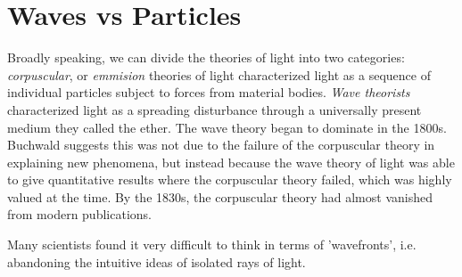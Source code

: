 \section{Waves vs Particles}

Broadly speaking, we can divide the theories of light into two categories: \emph{corpuscular}, or \emph{emmision} theories of light characterized light as a sequence of individual particles subject to forces from material bodies. \emph{Wave theorists} characterized light as a spreading disturbance through a universally present medium they called the ether. The wave theory began to dominate in the 1800s. Buchwald suggests this was not due to the failure of the corpuscular theory in explaining new phenomena, but instead because the wave theory of light was able to give quantitative results where the corpuscular theory failed, which was highly valued at the time. By the 1830s, the corpuscular theory had almost vanished from modern publications.

Many scientists found it very difficult to think in terms of 'wavefronts', i.e. abandoning the intuitive ideas of isolated rays of light.







